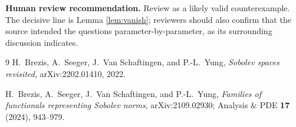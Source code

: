 \documentclass[11pt]{article}
\begin{document}
\medskip
\noindent
\textbf{Human review recommendation.}  Review as a likely valid
counterexample.  The decisive line is Lemma \ref{lem:vanish}; reviewers should
also confirm that the source intended the questions parameter-by-parameter,
as its surrounding discussion indicates.

\begin{thebibliography}{9}
H.~Brezis, A.~Seeger, J.~Van Schaftingen, and P.-L.~Yung,
\emph{Sobolev spaces revisited}, arXiv:2202.01410, 2022.

H.~Brezis, A.~Seeger, J.~Van Schaftingen, and P.-L.~Yung,
\emph{Families of functionals representing Sobolev norms},
arXiv:2109.02930; Analysis \& PDE \textbf{17} (2024), 943--979.
\end{thebibliography}
\end{document}
